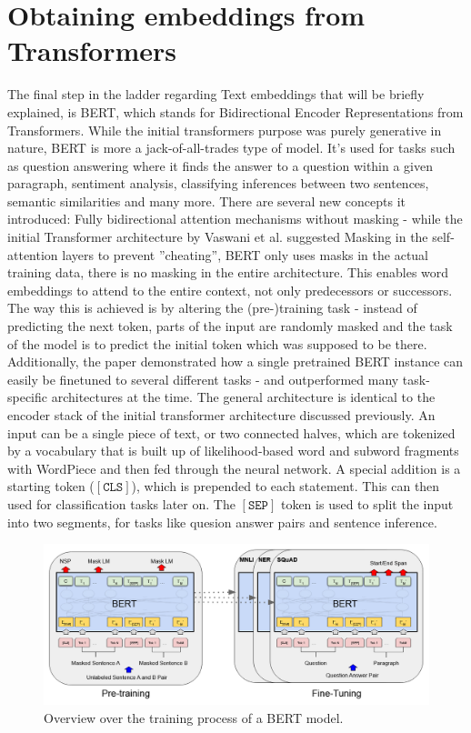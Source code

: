 \documentclass[draft,final]{vutinfth} %
\begin{document}
\section{Obtaining embeddings from Transformers}
The final step in the ladder regarding Text embeddings that will be briefly explained, is BERT, which stands for Bidirectional Encoder Representations from Transformers. While the initial transformers purpose was purely generative in nature, BERT is more a jack-of-all-trades type of model. It's used for tasks such as question answering where it finds the answer to a question within a given paragraph, sentiment analysis, classifying inferences between two sentences, semantic similarities and many more. There are several new concepts it introduced: Fully bidirectional attention mechanisms without masking - while the initial Transformer architecture by Vaswani et al. suggested Masking in the self-attention layers to prevent ''cheating'', BERT only uses masks in the actual training data, there is no masking in the entire architecture. This enables word embeddings to attend to the entire context, not only predecessors or successors. The way this is achieved is by altering the (pre-)training task - instead of predicting the next token, parts of the input are randomly masked and the task of the model is to predict the initial token which was supposed to be there. Additionally, the paper demonstrated how a single pretrained BERT instance can easily be finetuned to several different tasks - and outperformed many task-specific architectures at the time. The general architecture is identical to the encoder stack of the initial transformer architecture discussed previously. An input can be a single piece of text, or two connected halves, which are tokenized by a vocabulary that is built up of likelihood-based word and subword fragments with WordPiece \cite{wu_googles_2016} and then fed through the neural network. A special addition is a starting token ($\mathtt{[CLS]}$), which is prepended to each statement. This can then used for classification tasks later on. The $\mathtt{[SEP]}$ token is used to split the input into two segments, for tasks like quesion answer pairs and sentence inference. 
\begin{figure}[h!]
    \centering
    \includegraphics[width=0.9\linewidth]{thesis-figures/BERT-Architecture.png}
    \caption{Overview over the training process of a BERT model. \cite[p. 4173]{BERT}}
    \label{fig:BERT-training-setup}
\end{figure}
\end{document}
